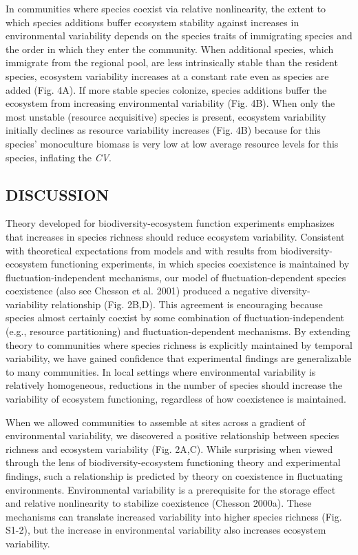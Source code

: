 \documentclass[12pt,]{article}
\begin{document}
In communities where species coexist via relative nonlinearity, the
extent to which species additions buffer ecosystem stability against
increases in environmental variability depends on the species traits of
immigrating species and the order in which they enter the community.
When additional species, which immigrate from the regional pool, are
less intrinsically stable than the resident species, ecosystem
variability increases at a constant rate even as species are added (Fig.
4A). If more stable species colonize, species additions buffer the
ecosystem from increasing environmental variability (Fig. 4B). When only
the most unstable (resource acquisitive) species is present, ecosystem
variability initially declines as resource variability increases (Fig.
4B) because for this species' monoculture biomass is very low at low
average resource levels for this species, inflating the \emph{CV}.

\subsection{DISCUSSION}\label{discussion}

Theory developed for biodiversity-ecosystem function experiments
emphasizes that increases in species richness should reduce ecosystem
variability. Consistent with theoretical expectations from models and
with results from biodiversity-ecosystem functioning experiments, in
which species coexistence is maintained by fluctuation-independent
mechanisms, our model of fluctuation-dependent species coexistence (also
see Chesson et al. 2001) produced a negative diversity-variability
relationship (Fig. 2B,D). This agreement is encouraging because species
almost certainly coexist by some combination of fluctuation-independent
(e.g., resource partitioning) and fluctuation-dependent mechanisms. By
extending theory to communities where species richness is explicitly
maintained by temporal variability, we have gained confidence that
experimental findings are generalizable to many communities. In local
settings where environmental variability is relatively homogeneous,
reductions in the number of species should increase the variability of
ecosystem functioning, regardless of how coexistence is maintained.

When we allowed communities to assemble at sites across a gradient of
environmental variability, we discovered a positive relationship between
species richness and ecosystem variability (Fig. 2A,C). While surprising
when viewed through the lens of biodiversity-ecosystem functioning
theory and experimental findings, such a relationship is predicted by
theory on coexistence in fluctuating environments. Environmental
variability is a prerequisite for the storage effect and relative
nonlinearity to stabilize coexistence (Chesson 2000a). These mechanisms
can translate increased variability into higher species richness (Fig.
S1-2), but the increase in environmental variability also increases
ecosystem variability.
\end{document}
